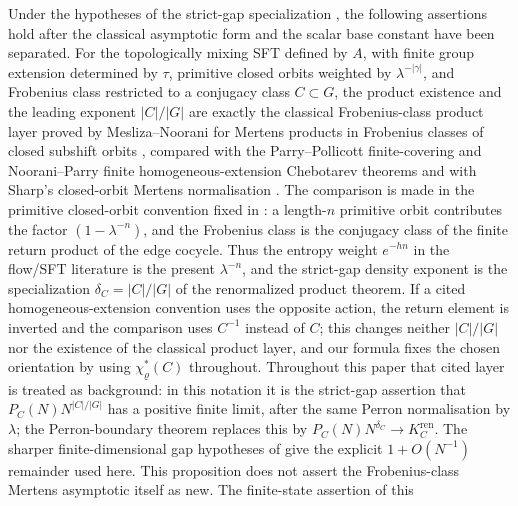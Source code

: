 \begin{remark}
  \label{prop:class-product-comparison}
  Under the hypotheses of the strict-gap specialization
  , the
  following assertions hold after the classical asymptotic form and the scalar
  base constant have been separated.  For the topologically mixing SFT defined
  by \(A\), with finite group extension determined by \(\tau\), primitive
  closed orbits weighted by \(\lambda^{-|\gamma|}\), and Frobenius class
  restricted to a conjugacy class \(C\subset G\), the product existence and the
  leading exponent \(|C|/|G|\) are exactly the classical Frobenius-class
  product layer proved by Mesliza--Noorani for Mertens products in Frobenius
  classes of closed subshift orbits \cite{MeslizaNoorani1999FrobeniusMertens},
  compared with the Parry--Pollicott finite-covering and Noorani--Parry finite
  homogeneous-extension Chebotarev theorems and with Sharp's closed-orbit
  Mertens normalisation
  \cite{ParryPollicott1986Chebotarev,NooraniParry1992ChebotarevShifts,Sharp1991Mertens}.
  The comparison is made in the primitive closed-orbit convention fixed in
  : a length-\(n\) primitive orbit contributes
  the factor \((1-\lambda^{-n})\), and the Frobenius class is the conjugacy
  class of the finite return product of the edge cocycle.  Thus the entropy
  weight \(e^{-hn}\) in the flow/SFT literature is the present
  \(\lambda^{-n}\), and the strict-gap density exponent is the specialization
  \(\delta_C=|C|/|G|\) of the renormalized product theorem.  If a cited
  homogeneous-extension convention uses the opposite
  action, the return element is inverted and the comparison uses \(C^{-1}\)
  instead of \(C\); this changes neither \(|C|/|G|\) nor the existence of the
  classical product layer, and our formula fixes the chosen orientation by
  using \(\chi_\varrho^\ast(C)\) throughout.
  Throughout this paper that cited layer is treated as background: in this
  notation it is the strict-gap assertion that
  \(P_C(N)N^{|C|/|G|}\) has a positive finite limit, after the same Perron
  normalisation by \(\lambda\); the Perron-boundary theorem replaces this by
  \(P_C(N)N^{\delta_C}\to K_C^{\mathrm{ren}}\).  The sharper finite-dimensional gap hypotheses
  of  give the explicit
  \(1+O(N^{-1})\) remainder used here.  This proposition does not assert the
  Frobenius-class Mertens asymptotic itself as new.  The finite-state assertion of this

\end{remark}
